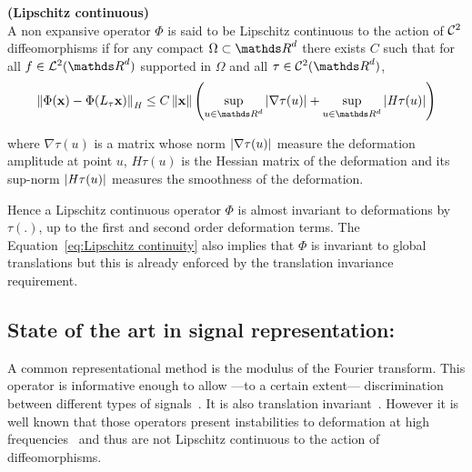 \documentclass[a4paper,11pt]{report}
\begin{document}
			\begin{defn} \textbf{(Lipschitz continuous)}\\
				A non expansive operator $\Phi$ is said to be Lipschitz continuous to the action of $\mathcal{C}^{2}$ diffeomorphisms if for any compact $\Omega \subset \dsR^{d}$ there exists $C$ such that for all $f \in \mcalL^{2}(\dsR^{d})$ supported in $\Omega$ and all $\tau \in \mcalC^{2}(\dsR^{d})$,
				\begin{equation}
					\norm{\Phi(\bfx) - \Phi(L_{\tau}\bfx)}_{\mathit{H}} \leq 
					C \norm{\bfx} \left(\sup_{u \in \dsR^{d}} \abs{\nabla \tau(u)} + \sup_{u \in \dsR^{d}} \abs{\mathit{H}\tau(u)}\right)
					\label{eq:Lipschitz continuity}
				\end{equation}
				\label{pty:Lipschitz continuity - intuition}
							
				where $\nabla \tau(u)$ is a matrix whose norm $\left| \nabla \tau(u) \right|$ measure the deformation amplitude at point $u$, $\mathit{H}\tau(u)$ is the Hessian matrix of the deformation and its sup-norm $\left| \mathit{H}\tau(u) \right|$ measures the smoothness of the deformation.\\
      \end{defn}

      Hence a Lipschitz continuous operator $\Phi$ is almost invariant to deformations by $\tau(.)$, up to the first and second order deformation terms. The Equation~\ref{eq:Lipschitz continuity} also implies that $\Phi$ is invariant to global translations but this is already enforced by the translation invariance requirement.\\ 
      

    \subsection{State of the art in signal representation:}
      \label{sec:Intro/Signal rep/State of the art}      
          
			A common representational method is the modulus of the Fourier transform. This operator is informative enough to allow ---to a certain extent--- discrimination between different types of signals~\citep{baker2014using}. It is also translation invariant~\citep{bracewell1965fourier}. However it is well known that those operators present instabilities to deformation at high frequencies~\citep{hormander1971fourier} and thus are not Lipschitz continuous to the action of diffeomorphisms.\\
      
\end{document}
